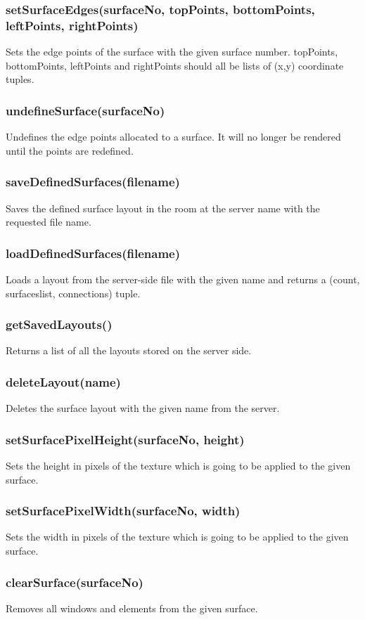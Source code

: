 \documentclass{acm_proc_article-sp}
\begin{document}
\subsubsection{setSurfaceEdges(surfaceNo, topPoints, bottomPoints, leftPoints, rightPoints)}
Sets the edge points of the surface with the given surface number. topPoints, bottomPoints, leftPoints and rightPoints should all be lists of (x,y) coordinate tuples.
\subsubsection{undefineSurface(surfaceNo)}
Undefines the edge points allocated to a surface. It will no longer be rendered until the points are redefined.
\subsubsection{saveDefinedSurfaces(filename)}
Saves the defined surface layout in the room at the server name with the requested file name.
\subsubsection{loadDefinedSurfaces(filename)}
Loads a layout from the server-side file with the given name and returns a (count, surfaceslist, connections) tuple.
\subsubsection{getSavedLayouts()}
Returns a list of all the layouts stored on the server side.
\subsubsection{deleteLayout(name)}
Deletes the surface layout with the given name from the server.
\subsubsection{setSurfacePixelHeight(surfaceNo, height)}
Sets the height in pixels of the texture which is going to be applied to the given surface.
\subsubsection{setSurfacePixelWidth(surfaceNo, width)}
Sets the width in pixels of the texture which is going to be applied to the given surface.
\subsubsection{clearSurface(surfaceNo)}
Removes all windows and elements from the given surface.
\end{document}
